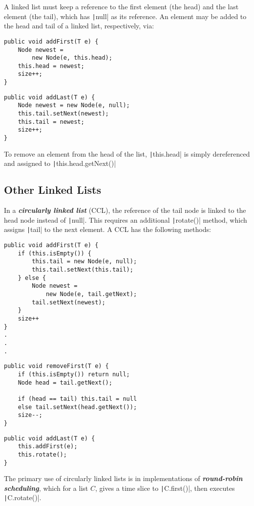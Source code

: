 \documentclass[12pt, letterpaper]{article}
\begin{document}
\bigskip
A linked list must keep a reference to the first element (the head) and the last element (the tail), which has \texttt|null| as its reference. An element may be added to the head and tail of a linked list, respectively, via:
\begin{multicols}{2}
\begin{verbatim}
public void addFirst(T e) {
    Node newest =
        new Node(e, this.head);
    this.head = newest;
    size++;
}
\end{verbatim}
\begin{verbatim}
public void addLast(T e) {
    Node newest = new Node(e, null);
    this.tail.setNext(newest);
    this.tail = newest;
    size++;
}
\end{verbatim}
\end{multicols}
To remove an element from the head of the list, \texttt|this.head| is simply dereferenced and assigned to \texttt|this.head.getNext()|

\subsection{Other Linked Lists }
In a \textbf{\textit{circularly linked list}} (CCL), the reference of the tail node is linked to the head node instead of \texttt|null|. This requires an additional \texttt|rotate()| method, which assigns \texttt|tail| to the next element. A CCL has the following methods:
\begin{multicols}{2}
\begin{verbatim}
public void addFirst(T e) {
    if (this.isEmpty()) {
        this.tail = new Node(e, null);
        this.tail.setNext(this.tail);
    } else {
        Node newest =
            new Node(e, tail.getNext);
        tail.setNext(newest);
    }
    size++
}
.
.
.
\end{verbatim}
\columnbreak
\begin{verbatim}
public void removeFirst(T e) {
    if (this.isEmpty()) return null;
    Node head = tail.getNext();

    if (head == tail) this.tail = null
    else tail.setNext(head.getNext());
    size--;
}
\end{verbatim}
\begin{verbatim}
public void addLast(T e) {
    this.addFirst(e);
    this.rotate();
}
\end{verbatim}
\end{multicols}
The primary use of circularly linked lists is in implementations of \textbf{\textit{round-robin scheduling}}, which for a list $C$, gives a time slice to \texttt|C.first()|, then executes \texttt|C.rotate()|.
\end{document}

